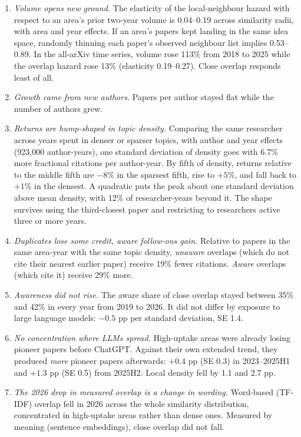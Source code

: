 \begin{enumerate}[label=\textbf{Fact \arabic*.},ref=\arabic*,leftmargin=*]
\item\label{fact:volume} \emph{Volume opens new ground.} The elasticity of the
local-neighbour hazard with respect to an area's prior two-year volume is
0.04--0.19 across similarity radii, with area and year effects. If an area's
papers kept landing in the same idea space, randomly thinning each paper's
observed neighbour list implies 0.53--0.89. In the all-arXiv time series, volume
rose 113\% from 2018 to 2025 while the overlap hazard rose 13\% (elasticity
0.19--0.27). Close overlap responds least of all.

\item\label{fact:authors} \emph{Growth came from new authors.} Papers per author
stayed flat while the number of authors grew.

\item\label{fact:hump} \emph{Returns are hump-shaped in topic density.} Comparing
the same researcher across years spent in denser or sparser topics, with author
and year effects (923,000 author-years), one standard deviation of density goes
with 6.7\% more fractional citations per author-year. By fifth of density,
returns relative to the middle fifth are $-8\%$ in the sparsest fifth, rise to
$+5\%$, and fall back to $+1\%$ in the densest. A quadratic puts the peak about
one standard deviation above mean density, with 12\% of researcher-years beyond
it. The shape survives using the third-closest paper and restricting to
researchers active three or more years.

\item\label{fact:credit} \emph{Duplicates lose some credit, aware follow-ons gain.}
Relative to papers in the same area-year with the same topic density,
\emph{unaware} overlaps (which do not cite their nearest earlier paper) receive
19\% fewer citations. \emph{Aware} overlaps (which cite it) receive 29\% more.

\item\label{fact:aware} \emph{Awareness did not rise.} The aware share of close
overlap stayed between 35\% and 42\% in every year from 2019 to 2026. It did not
differ by exposure to large language models: $-0.5$ pp per standard deviation,
SE 1.4.

\item\label{fact:concentration} \emph{No concentration where LLMs spread.}
High-uptake areas were already losing pioneer papers before ChatGPT. Against
their own extended trend, they produced \emph{more} pioneer papers afterwards:
$+0.4$ pp (SE 0.3) in 2023--2025H1 and $+1.3$ pp (SE 0.5) from 2025H2. Local density
fell by 1.1 and 2.7 pp.

\item\label{fact:wording} \emph{The 2026 drop in measured overlap is a change in wording.}
Word-based (TF-IDF) overlap fell in 2026 across the whole similarity
distribution, concentrated in high-uptake areas rather than dense ones. Measured
by meaning (sentence embeddings), close overlap did not fall.
\end{enumerate}

